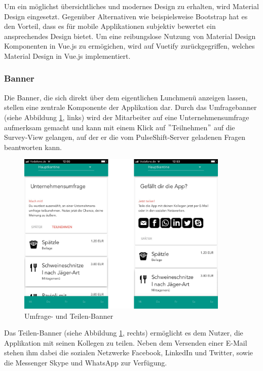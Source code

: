 Um ein möglichst übersichtliches und modernes Design zu erhalten, wird Material Design eingesetzt. Gegenüber Alternativen wie beispielsweise Bootstrap hat es den Vorteil, dass es für mobile Applikationen subjektiv bewertet ein ansprechendes Design bietet. Um eine reibungslose Nutzung von Material Design Komponenten in Vue.js zu ermögichen, wird auf Vuetify zurückgegriffen, welches Material Design in Vue.js implementiert.

\subsubsection{Banner}

Die Banner, die sich direkt über dem eigentlichen Lunchmenü anzeigen lassen, stellen eine zentrale Komponente der Applikation dar. Durch das Umfragebanner (siehe Abbildung \ref{fig:banners}, links) wird der Mitarbeiter auf eine Unternehmensumfrage aufmerksam gemacht und kann mit einem Klick auf $"$Teilnehmen$"$ auf die Survey-View gelangen, auf der er die vom PulseShift-Server geladenen Fragen beantworten kann.

\begin{figure}[H]
\centering
\includegraphics[width=0.9\textwidth]{images/banners}
\caption[Umfrage- und Teilen-Banner]{Umfrage- und Teilen-Banner}
\label{fig:banners}
\end{figure}

Das Teilen-Banner (siehe Abbildung \ref{fig:banners}, rechts) ermöglicht es dem Nutzer, die Applikation mit seinen Kollegen zu teilen. Neben dem Versenden einer E-Mail stehen ihm dabei die sozialen Netzwerke Facebook, LinkedIn und Twitter, sowie die Messenger Skype und WhatsApp zur Verfügung.

